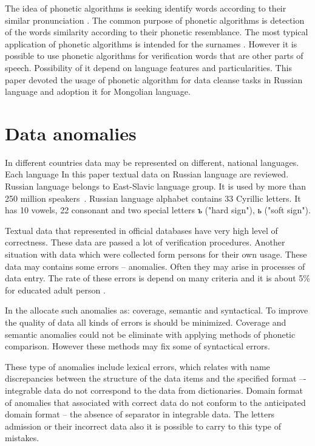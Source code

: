 \documentclass[conference,a4paper]{IEEEtran}
\begin{document}
The idea of phonetic algorithms is seeking identify words according to their similar pronunciation \cite{Parmar-2014}. The common purpose of phonetic algorithms is detection of the words similarity according to their phonetic resemblance. The most typical application of phonetic algorithms is intended for the surnames \cite{Zahoransky-2015}. However it is possible to use phonetic algorithms for verification words that are other parts of speech. Possibility of it depend on language features and particularities. This paper devoted the usage of phonetic algorithm for data cleanse tasks in Russian language and adoption it for Mongolian language.

\section{Data anomalies}
In different countries data may be represented on different, national languages. Each language  In this paper textual data on Russian language are reviewed. Russian language belongs to East-Slavic language group. It is used by more than 250 million speakers~\cite{Cubberley-2002}. Russian language alphabet contains 33 Cyrillic letters. It has 10 vowels, 22 consonant and two special letters ъ ("hard sign"), ь ("soft sign").

Textual data that represented in official databases have very high level of correctness. These data are passed a lot of verification procedures. Another situation with data which were collected form persons for their own usage. These data may contains some errors – anomalies. Often they may arise in processes of data entry. The rate of these errors is depend on many criteria and it is about 5\% for educated adult person \cite{Orr-1998}.

In the \cite{Osipov-2002} allocate such anomalies as: coverage, semantic and syntactical. To improve the quality of data all kinds of errors is should be minimized. Coverage and semantic anomalies could not be eliminate with applying methods of phonetic comparison. However these methods may fix some of syntactical errors.

These type of anomalies include lexical errors, which relates with name discrepancies between the structure of the data items and the specified format –- integrable data do not correspond to the data from dictionaries.  Domain format of anomalies that associated with correct data do not conform to the anticipated domain format – the absence of separator in integrable data. The letters admission or their incorrect data also it is possible to carry to this type of mistakes.
\end{document}
